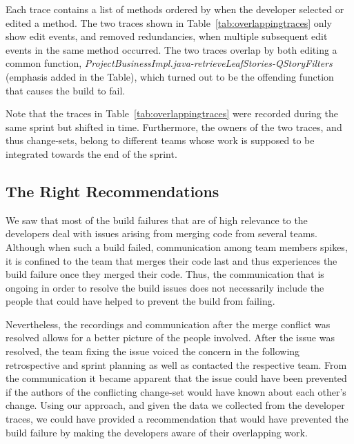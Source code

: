 Each trace contains a list of methods ordered by when the developer selected or edited a method.
The two traces shown in Table~\ref{tab:overlappingtraces} only show edit events, and removed redundancies, when multiple subsequent edit events in the same method occurred.
The two traces overlap by both editing a common function, \emph{ProjectBusinessImpl.java-retrieveLeafStories-QStoryFilters} (emphasis added in the Table), which turned out to be the offending function that causes the build to fail.

Note that the traces in Table~\ref{tab:overlappingtraces} were recorded during the same sprint but shifted in time.
Furthermore, the owners of the two traces, and thus change-sets, belong to different teams whose work is supposed to be integrated towards the end of the sprint.

\subsection{The Right Recommendations}
We saw that most of the build failures that are of high relevance to the developers deal with issues arising from merging code from several teams.
Although when such a build failed, communication among team members spikes, it is confined to the team that merges their code last and thus experiences the build failure once they merged their code.
Thus, the communication that is ongoing in order to resolve the build issues does not necessarily include the people that could have helped to prevent the build from failing.

Nevertheless, the recordings and communication after the merge conflict was resolved allows for a better picture of the people involved.
After the issue was resolved, the team fixing the issue voiced the concern in the following retrospective and sprint planning as well as contacted the respective team.
From the communication it became apparent that the issue could have been prevented if the authors of the conflicting change-set would have known about each other's change.
Using our approach, and given the data we collected from the developer traces, we could have provided a recommendation that would have prevented the build failure by making the developers aware of their overlapping work.

